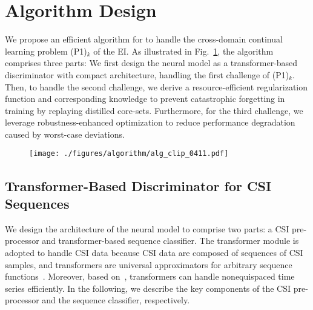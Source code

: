 \section{Algorithm Design}\label{sec_algorithm}



We propose an efficient algorithm for \name to handle the cross-domain continual learning problem (P1)$_k$ of the EI.
As illustrated in Fig.~\ref{fig_alg_illu}, the algorithm comprises three parts:
We first design the neural model as a transformer-based discriminator with compact architecture, handling the first challenge of (P1)$_k$.
Then, to handle the second challenge, we derive a resource-efficient regularization function and corresponding knowledge to prevent catastrophic forgetting in training by replaying distilled core-sets.
Furthermore, for the third challenge, we leverage robustness-enhanced optimization to reduce performance degradation caused by worst-case deviations. 

\begin{figure}[t]
    \centering
    \texttt{[image: ./figures/algorithm/alg\_clip\_0411.pdf]}
    \vspace{.5em}
        \caption{}
        \label{fig_alg_illu}
\vspace{-.5em}
\end{figure}

 \subsection{Transformer-Based Discriminator for CSI Sequences}\label{sec_alg_1}
We design the architecture of the neural model to comprise two parts: a CSI pre-processor and transformer-based sequence classifier. 
The transformer module is adopted to handle CSI data because CSI data are composed of sequences of CSI samples, and transformers are universal approximators for arbitrary sequence functions~\cite{Yun2020ICLR_Are}.
Moreover, based on~\cite{Hu24JSAC_Cross}, transformers can handle nonequispaced time series efficiently.
In the following, we describe the key components of the CSI pre-processor and the sequence classifier, respectively.

